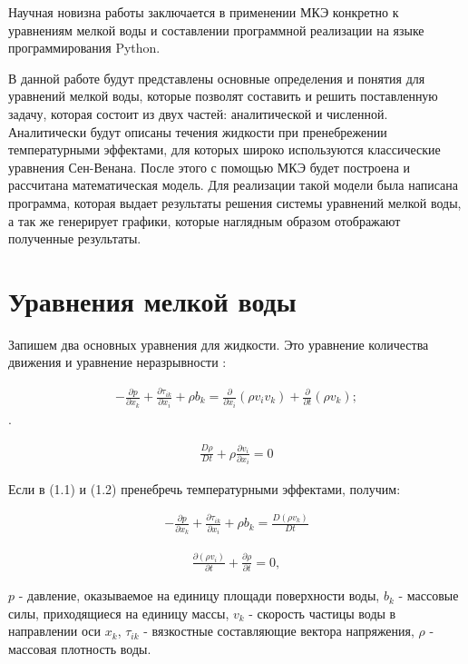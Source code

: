 \documentclass[14pt]{extreport}
\begin{document}
Научная новизна работы заключается в применении МКЭ конкретно к уравнениям мелкой воды и составлении программной реализации на языке программирования Python.

В данной работе будут представлены основные определения и понятия для уравнений мелкой воды, которые позволят составить и решить поставленную задачу, которая состоит из двух частей: аналитической и численной. Аналитически будут описаны течения жидкости при пренебрежении температурными эффектами, для которых широко используются классические уравнения Сен-Венана. После этого с помощью МКЭ будет построена и рассчитана математическая модель. Для реализации такой модели была написана программа, которая выдает результаты решения системы уравнений мелкой воды, а так же генерирует графики, которые наглядным образом отображают полученные результаты.

\chapter{Уравнения мелкой воды}

Запишем два основных уравнения для жидкости. Это уравнение количества движения и уравнение неразрывности \cite{Konor:1979:FEM}:

\begin{gather}
-\frac{\partial p}{\partial x_k} + \frac{\partial \tau_{ik}}{\partial x_i} + \rho b_k = \frac{\partial}{\partial x_i}(\rho v_i v_k) + \frac{\partial}{\partial t}(\rho v_k);
\end{gather}.

\begin{gather}
\frac{D\rho}{Dt}+\rho \frac{\partial v_i}{\partial x_i} =0
\end{gather}

Если в (1.1) и (1.2) пренебречь температурными эффектами, получим:

\begin{gather}-\frac{\partial p}{\partial x_k} + \frac{\partial \tau_{ik}}{\partial x_i} + \rho b_k = \frac{D(\rho v_k)}{Dt}
\end{gather}

\begin{gather}\frac{\partial (\rho v_i)}{\partial t} + \frac{\partial \rho}{\partial t}=0,
\end{gather}

 $ p $ - давление, оказываемое на единицу площади поверхности воды, $ b_k $ - массовые силы, приходящиеся на единицу массы, $v_k$ - скорость частицы воды в направлении оси $x_k$, $\tau_{ik}$ - вязкостные составляющие вектора напряжения, $ \rho $ - массовая плотность воды.
\end{document}
